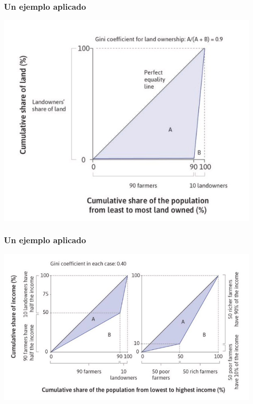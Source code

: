 \documentclass{beamer}
\begin{document}
\begin{frame} 
\frametitle{Un ejemplo aplicado}
    \begin{center}    
    \includegraphics[scale=0.55]{Slides Principios de Economia/Tema_04.18_lorenz3.jpg}
    \end{center}
\end{frame}

\begin{frame} 
\frametitle{Un ejemplo aplicado}
    \begin{center}    
    \includegraphics[scale=0.55]{Slides Principios de Economia/Tema_04.20_variedaddesigual.jpg}
    \end{center}
\end{frame}
\end{document}
